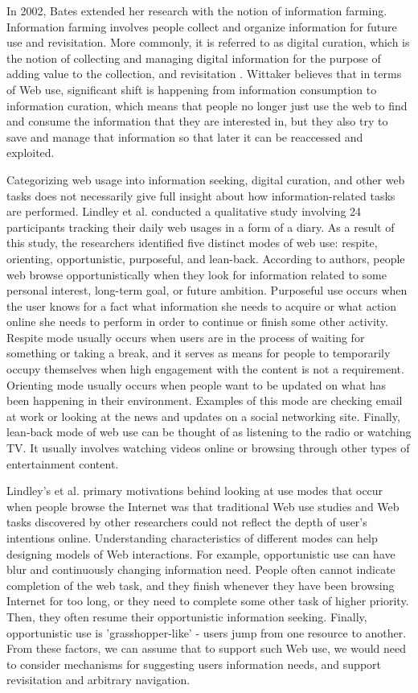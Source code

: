 \documentclass{casconpaper}
\begin{document}
{In 2002, Bates \cite{bates2002} extended her research with the notion of information farming. Information farming involves people collect and organize information for future use and revisitation. More commonly, it is referred to as digital curation, which is the notion of collecting and managing digital information for the purpose of adding value to the collection, and revisitation \cite{beagrie}. Wittaker \cite{wittaker} believes that in terms of Web use, significant shift is happening from information consumption to information curation, which means that people no longer just use the web to find and consume the information that they are interested in, but they also try to save and manage that information so that later it can be reaccessed and exploited. 

Categorizing web usage into information seeking,  digital curation, and other web tasks does not necessarily give full insight about how information-related tasks are performed. Lindley et al. \cite{lindley} conducted a qualitative study involving 24 participants tracking their daily web usages in a form of a diary. As a result of this study, the researchers identified five distinct modes of web use: respite, orienting, opportunistic, purposeful, and lean-back. According to authors, people web browse opportunistically when they look for information related to some personal interest, long-term goal, or future ambition. Purposeful use occurs when the user knows for a fact what information she needs to acquire or what action online she needs to perform in order to continue or finish some other activity. Respite mode usually occurs when users are in the process of waiting for something or taking a break, and it serves as means for people to temporarily occupy themselves when high engagement with the content is not a requirement. Orienting mode usually occurs when people want to be updated on what has been happening in their environment. Examples of this mode are checking email at work or looking at the news and updates on a social networking site. Finally, lean-back mode of web use can be thought of as listening to the radio or watching TV. It usually involves watching videos online or browsing through other types of entertainment content. 

Lindley's et al. primary motivations behind looking at use modes that occur when people browse the Internet was that traditional Web use studies and Web tasks discovered by other researchers could not reflect the depth of user's intentions online. Understanding characteristics of different modes can help designing models of Web interactions. For example, opportunistic use can have blur and continuously changing information need. People often cannot indicate completion of the web task, and they finish whenever they have been browsing Internet for too long, or they need to complete some other task of higher priority. Then, they often resume their opportunistic information seeking. Finally, opportunistic use is 'grasshopper-like' - users jump from one resource to another. From these factors, we can assume that to support such Web use, we would need to consider mechanisms for suggesting users information needs, and support revisitation and arbitrary navigation.

}
\end{document}
